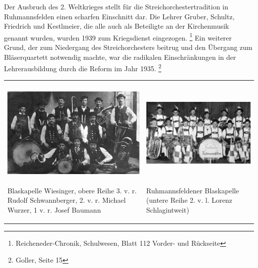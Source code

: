 Der Ausbruch des 2. Weltkrieges stellt für die Streichorchestertradition
in Ruhmannsfelden einen scharfen Einschnitt dar. Die Lehrer Gruber,
Schultz, Friedrich und Kestlmeier, die alle auch als Beteiligte an der
Kirchenmusik genannt wurden, wurden 1939 zum Kriegsdienst
eingezogen. \footnote{Reicheneder-Chronik, Schulwesen, Blatt 112
Vorder- und Rückseite} Ein weiterer Grund, der zum Niedergang des
Streichorchesters beitrug und den Übergang zum Bläserquartett notwendig
machte, war die radikalen Einschränkungen in der Lehrerausbildung durch
die Reform im Jahr 1935. \footnote{Goller, Seite 15}

\begin{flushleft}
\tablefirsthead{}
\tablehead{}
\tabletail{}
\tablelasttail{}
\begin{supertabular}{m{7.573cm}m{8.08cm}}

\includegraphics[width=7.391cm,height=4.703cm]{pictures/zulassungsarbeit-img073.jpg}

Blaskapelle
Wiesinger, obere Reihe 3. v. r. Rudolf Schwannberger, 2. v. r. Michael
Wurzer, 1 v. r. Josef Baumann &

\includegraphics[width=7.897cm,height=4.706cm]{pictures/zulassungsarbeit-img074.jpg}

\begin{figure}
\img{}
\caption{}
\end{figure}

Ruhmannsfeldener Blaskapelle (untere Reihe 2. v. l. Lorenz
Schlagintweit)\\
\end{supertabular}
\end{flushleft}
